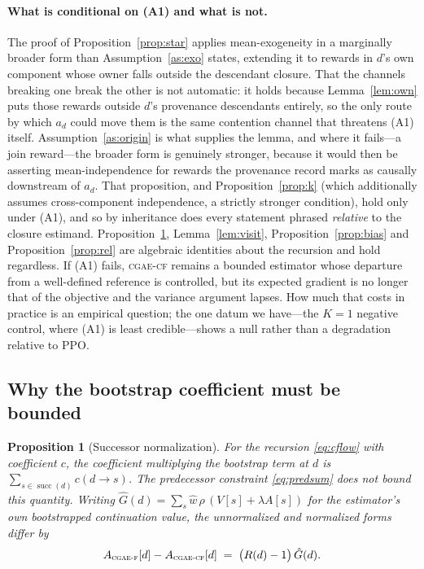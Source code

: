 \documentclass[review,authoryear,3p,times]{elsarticle}
\newtheorem{proposition}{Proposition}
\newcommand{\cflow}{\textsc{cgae-cf}}          %
\newcommand{\cflowraw}{\textsc{cgae-f}}        %
\newcommand{\suc}{\operatorname{succ}}
\begin{document}
\paragraph{What is conditional on (A1) and what is not.} The proof of
Proposition~\ref{prop:star} applies mean-exogeneity in a marginally broader form
than Assumption~\ref{as:exo} states, extending it to rewards in $d$'s own
component whose owner falls outside the descendant closure. That the channels
breaking one break the other is not automatic: it holds because
Lemma~\ref{lem:own} puts those rewards outside $d$'s provenance descendants
entirely, so the only route by which $a_d$ could move them is the same
contention channel that threatens (A1) itself. Assumption~\ref{as:origin} is
what supplies the lemma, and where it fails---a join reward---the broader form
is genuinely stronger, because it would then be asserting mean-independence for
rewards the provenance record marks as causally downstream of $a_d$. That
proposition, and Proposition~\ref{prop:k}
(which additionally assumes cross-component independence, a strictly stronger
condition), hold only under (A1), and so by inheritance does every statement
phrased \emph{relative} to the closure estimand. Proposition~\ref{prop:s},
Lemma~\ref{lem:visit}, Proposition~\ref{prop:bias} and
Proposition~\ref{prop:rel} are algebraic identities about the recursion and hold
regardless. If (A1) fails, \cflow{} remains a bounded estimator whose departure
from a well-defined reference is controlled, but its expected gradient is no
longer that of the objective and the variance argument lapses. How much that
costs in practice is an empirical question; the one datum we have---the $K=1$
negative control, where (A1) is least credible---shows a null rather than a
degradation relative to PPO.

\subsection{Why the bootstrap coefficient must be bounded}

\begin{proposition}[Successor normalization]
\label{prop:s}
For the recursion \eqref{eq:cflow} with coefficient $c$, the coefficient
multiplying the bootstrap term at $d$ is $\sum_{s\in\suc(d)}c(d\!\to\!s)$. The
predecessor constraint \eqref{eq:predsum} does not bound this quantity. Writing
$\hat{G}(d)=\sum_s \hat w\,\rho\,(V[s]+\lambda A[s])$ for the estimator's own
bootstrapped continuation value, the unnormalized and normalized forms differ by
\begin{equation}
A_{\cflowraw}[d]-A_{\cflow}[d] \;=\; \bigl(R(d)-1\bigr)\,\hat{G}(d).
\label{eq:defect}
\end{equation}
\end{proposition}
\end{document}
